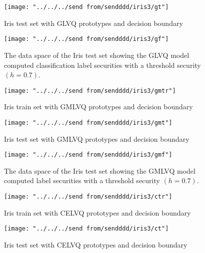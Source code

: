 \begin{figure}[H]
	\centering
	\texttt{[image: "../../../send from/sendddd/iris3/gt"]}
	\caption[Iris test set with GLVQ prototypes]{Iris test set with GLVQ prototypes and decision boundary}
	\label{fig:ig2}
\end{figure}


\begin{figure}[H]
	\centering
	\texttt{[image: "../../../send from/sendddd/iris3/gf"]}
	\caption[Iris test set classification label security (GLVQ)]{The data space of the Iris test set showing the GLVQ model computed classification label securities with a threshold security $(h=0.7)$.}
	\label{fig:igd1}
\end{figure}


\begin{figure}[H]
	\centering
	\texttt{[image: "../../../send from/sendddd/iris3/gmtr"]}
	\caption[Iris train set with GMLVQ prototypes]{Iris train set with GMLVQ prototypes and decision boundary}
	\label{fig:igm1}
\end{figure}

\begin{figure}[H]
	\centering
	\texttt{[image: "../../../send from/sendddd/iris3/gmt"]}
	\caption[Iris test set with GMLVQ prototypes]{Iris test set with GMLVQ prototypes and decision boundary}
	\label{fig:igm2}
\end{figure}


\begin{figure}[H]
	\centering
	\texttt{[image: "../../../send from/sendddd/iris3/gmf"]}
	\caption[Iris test set classification label security (GMLVQ)]{The data space of the Iris test set showing the GMLVQ model computed label securities with a threshold security $(h=0.7)$.}
	\label{fig:igmd1}
\end{figure}


\begin{figure}[H]
	\centering
	\texttt{[image: "../../../send from/sendddd/iris3/ctr"]}
	\caption[Iris train set with CELVQ prototypes]{Iris train set with CELVQ prototypes and decision boundary}
	\label{fig:ic1}
\end{figure}


\begin{figure}[H]
	\centering
	\texttt{[image: "../../../send from/sendddd/iris3/ct"]}
	\caption[Iris test set with CELVQ prototypes]{Iris test set with CELVQ prototypes and decision boundary}
	\label{fig:ic2}
\end{figure}


